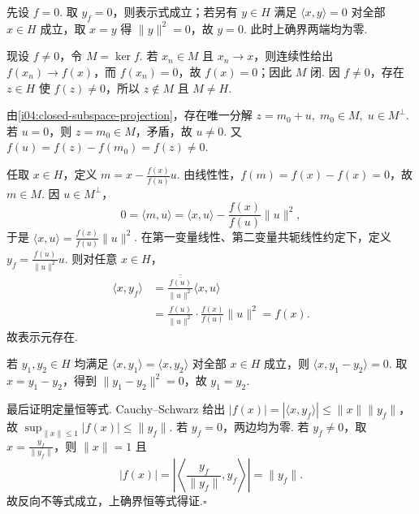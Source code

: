 \begin{FAProof}
先设 \(\displaystyle f=0\). 取 \(\displaystyle y_f=0\)，则表示式成立；若另有 \(\displaystyle y\in H\) 满足 \(\displaystyle \langle x,y\rangle=0\) 对全部 \(\displaystyle x\in H\) 成立，取 \(\displaystyle x=y\) 得 \(\displaystyle \|y\|^2=0\)，故 \(\displaystyle y=0\). 此时上确界两端均为零.

现设 \(\displaystyle f\neq0\)，令 \(\displaystyle M=\ker f\). 若 \(\displaystyle x_n\in M\) 且 \(\displaystyle x_n\to x\)，则连续性给出 \(\displaystyle f(x_n)\to f(x)\)，而 \(\displaystyle f(x_n)=0\)，故 \(\displaystyle f(x)=0\)；因此 \(\displaystyle M\) 闭. 因 \(\displaystyle f\neq0\)，存在 \(\displaystyle z\in H\) 使 \(\displaystyle f(z)\neq0\)，所以 \(\displaystyle z\notin M\) 且 \(\displaystyle M\neq H\).

由\autoref{i04:closed-subspace-projection}，存在唯一分解 \(\displaystyle z=m_0+u, \; m_0\in M, \; u\in M^\perp\).
若 \(\displaystyle u=0\)，则 \(\displaystyle z=m_0\in M\)，矛盾，故 \(\displaystyle u\neq0\). 又 \(\displaystyle f(u)=f(z)-f(m_0)=f(z)\neq0\).

任取 \(\displaystyle x\in H\)，定义 \(\displaystyle m=x-\frac{f(x)}{f(u)}u\).
由线性性，\(\displaystyle f(m)=f(x)-f(x)=0\)，故 \(\displaystyle m\in M\). 因 \(\displaystyle u\in M^\perp\)，
\[
0=\langle m,u\rangle
=\langle x,u\rangle-\frac{f(x)}{f(u)}\|u\|^2,
\]
于是 \(\displaystyle \langle x,u\rangle =\frac{f(x)}{f(u)}\|u\|^2\).
在第一变量线性、第二变量共轭线性约定下，定义 \(\displaystyle y_f =\frac{\overline{f(u)}}{\|u\|^2}u\).
则对任意 \(\displaystyle x\in H\)，
\begin{align*}
\displaystyle \langle x,y_f\rangle
&\displaystyle =\overline{\frac{\overline{f(u)}}{\|u\|^2}}\langle x,u\rangle\\[12pt]
&\displaystyle =\frac{f(u)}{\|u\|^2}\cdot\frac{f(x)}{f(u)}\|u\|^2=f(x).
\end{align*}
故表示元存在.

若 \(\displaystyle y_1,y_2\in H\) 均满足 \(\displaystyle \langle x,y_1\rangle=\langle x,y_2\rangle\) 对全部 \(\displaystyle x\in H\) 成立，则 \(\displaystyle \langle x,y_1-y_2\rangle=0\). 取 \(\displaystyle x=y_1-y_2\)，得到 \(\displaystyle \|y_1-y_2\|^2=0\)，故 \(\displaystyle y_1=y_2\).

最后证明定量恒等式. Cauchy--Schwarz 给出 \(\displaystyle |f(x)| =|\langle x,y_f\rangle| \leqslant\|x\|\|y_f\|\)，
故 \(\displaystyle \sup_{\|x\|\leqslant1}|f(x)|\leqslant\|y_f\|\). 若 \(\displaystyle y_f=0\)，两边均为零. 若 \(\displaystyle y_f\neq0\)，取 \(\displaystyle x=\frac{y_f}{\|y_f\|}\)，则 \(\displaystyle \|x\|=1\) 且
\[
|f(x)|
=\left|\left\langle\frac{y_f}{\|y_f\|},y_f\right\rangle\right|
=\|y_f\|.
\]
故反向不等式成立，上确界恒等式得证.\hfill\(\square\)

\end{FAProof}

